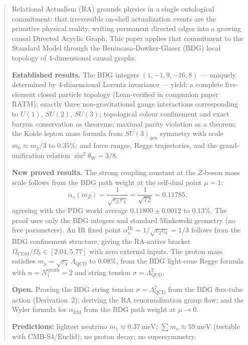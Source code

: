 \documentclass[11pt,a4paper]{article}
\begin{document}
\begin{abstract}
Relational Actualism (RA) grounds physics in a single ontological commitment:
that irreversible on-shell actualization events are the primitive physical
reality, writing permanent directed edges into a growing causal Directed
Acyclic Graph. This paper applies that commitment to the Standard Model through
the Benincasa-Dowker-Glaser (BDG) local topology of 4-dimensional causal graphs.

\textbf{Established results.}
The BDG integers $(1,-1,9,-16,8)$ --- uniquely determined by 4-dimensional
Lorentz invariance --- yield: a complete five-element closed particle topology
(Lean-verified in companion paper RATM); exactly three non-gravitational gauge
interactions corresponding to $U(1)$, $SU(2)$, $SU(3)$; topological colour
confinement and exact baryon conservation as theorems; maximal parity violation
as a theorem; the Koide lepton mass formula from $SU(3)_{\mathrm{gen}}$ symmetry
with scale $m_0 \approx m_p/3$ to $0.35\%$; and force ranges, Regge trajectories,
and the grand-unification relation $\sin^2\theta_W = 3/8$.

\textbf{New proved results.}
The strong coupling constant at the $Z$-boson mass scale follows from the BDG
path weight at the self-dual point $\mu=1$:
\begin{equation*}
  \alpha_s(m_Z) = \frac{1}{\sqrt{c_2\,c_4}} = \frac{1}{\sqrt{72}} = 0.11785,
\end{equation*}
agreeing with the PDG world average $0.11800\pm0.0012$ to $0.13\%$. The proof
uses only the BDG integers and standard Minkowski geometry (no free parameters).
An IR fixed point $\alpha_s^{\mathrm{IR}} = 1/\sqrt{c_2 c_0} = 1/3$ follows from
the BDG confinement structure, giving the RA-native bracket
$\Omega_{\mathrm{CDM}}/\Omega_b \in [2.04, 5.77]$ with zero external inputs.
The proton mass satisfies $m_p = \sqrt{c_4}\,\Lambda_{\mathrm{QCD}}$
to $0.08\%$, from the BDG light-cone Regge formula with $n = N_1^{\mathrm{quark}} = 2$
and string tension $\sigma = \Lambda_{\mathrm{QCD}}^2$.

\textbf{Open.}
Proving the BDG string tension $\sigma = \Lambda_{\mathrm{QCD}}^2$ from the
BDG flux-tube action (Derivation~2); deriving the RA renormalization group
flow; and the Wyler formula for $\alpha_{\mathrm{EM}}$ from the BDG path
weight at $\mu\to 0$.

\textbf{Predictions:} lightest neutrino $m_1 \approx 0.37~\mathrm{meV}$;
$\sum m_\nu \approx 59~\mathrm{meV}$ (testable with CMB-S4/Euclid); no proton
decay; no supersymmetry.
\end{abstract}
\end{document}
